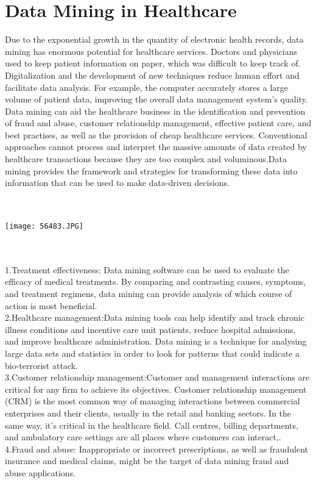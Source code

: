 \documentclass[12pt,letterpaper]{article}
\begin{document}
\section{Data Mining in Healthcare}
Due to the exponential growth in the quantity of electronic health records, data mining has enormous potential for healthcare services. Doctors and physicians used to keep patient information on paper, which was difficult to keep track of. Digitalization and the development of new techniques reduce human effort and facilitate data analysis. For example, the computer accurately stores a large volume of patient data, improving the overall data management system's quality. Data mining can aid the healthcare business in the identification and prevention of fraud and abuse, customer relationship management, effective patient care, and best practises, as well as the provision of cheap healthcare services. Conventional approaches cannot process and interpret the massive amounts of data created by healthcare transactions because they are too complex and voluminous.Data mining provides the framework and strategies for transforming these data into information that can be used to make data-driven decisions.\\
\\
 \\ \begin{center} \texttt{[image: 56483.JPG]}
\end{center}\\
\\
 1.Treatment effectiveness: Data mining software can be used to evaluate the efficacy of medical treatments. By comparing and contrasting causes, symptoms, and treatment regimens, data mining can provide analysis of which course of action is most beneficial.\\
 
 2.Healthcare management:Data mining tools can help identify and track chronic illness conditions and incentive care unit patients, reduce hospital admissions, and improve healthcare administration. Data mining is a technique for analysing large data sets and statistics in order to look for patterns that could indicate a bio-terrorist attack.\\
 
 3.Customer relationship management:Customer and management interactions are critical for any firm to achieve its objectives. Customer relationship management (CRM) is the most common way of managing interactions between commercial enterprises and their clients, usually in the retail and banking sectors. In the same way, it's critical in the healthcare field. Call centres, billing departments, and ambulatory care settings are all places where customers can interact,.\\
 
 4.Fraud and abuse:
Inappropriate or incorrect prescriptions, as well as fraudulent insurance and medical claims, might be the target of data mining fraud and abuse applications.\\
\end{document}

